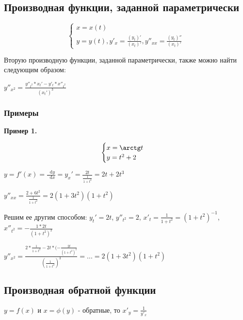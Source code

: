 \documentclass{article}
\newcommand*\diff{\mathop{}\!\mathrm{d}}
\begin{document}
\subsection{Производная функции, заданной параметрически}

\begin{flushleft}

\begin{equation}
    \begin{cases}
        x = x(t) \\
        y = y(t), y'_x = \frac{(y_t)'}{(x_t)'}, y''_{xx} = \frac{(y_t)''}{(x_t)'}
    \end{cases}
\end{equation}

Вторую производную функции, заданной параметрически, также можно найти следующим образом:

$y''_{x^2} = \frac{y''_{t^2} * x_t' - y'_t * x''_{t^2}}{(x_t')^3}$

\subsubsection{Примеры}

\textbf{Пример 1.}

\begin{equation}
    \begin{cases}
        x = \arctg t \\
        y = t^2 + 2
    \end{cases}
\end{equation}

$y = f'(x) = \frac{\diff y}{\diff x} = y_x' = \frac{2t}{\frac{1}{1 + t^2}} = 2t + 2t^3$

$y''_{xx} = \frac{2 + 6t^2}{\frac{1}{1 + t^2}} = 2(1 + 3t^2)(1 + t^2)$

\hfill

Решим ее другим способом: $y_t' = 2t$, $y''_{t^2} = 2$, $x'_t = \frac{1}{1 + t^2} = (1 + t^2)^{-1}$, $x''_{t^2} = -\frac{1 * 2t}{(1 + t^2)^2}$

$y''_{x^2} = \frac{2 * \frac{1}{1 + t^2} - 2t * (-\frac{2t}{(1+t^2)^2}}{(\frac{1}{1 + t^2})^3} = ... = 2(1 + 3t^2)(1 + t^2)$

\subsection{Производная обратной функции}

$y = f(x)$ и $x = \phi(y)$ - обратные, то $x'_y = \frac{1}{y'_{x}}$


\end{flushleft}
\end{document}
